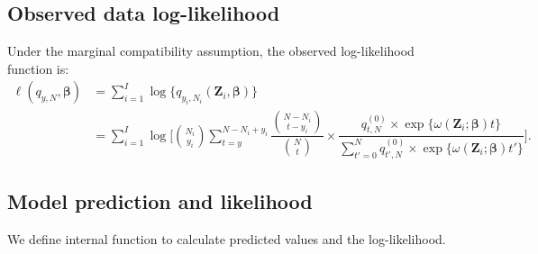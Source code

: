 \documentclass[reqno]{amsart}
\begin{document}
\subsection{Observed data log-likelihood}
Under the marginal compatibility assumption, the observed log-likelihood function is:
\begin{equation}\label{E:loglikelihood}
\begin{split}
    \ell (q_{y,N}, \boldsymbol{\beta}) &= \sum_{i=1}^I \log \{ q_{y_i,N_i} (\boldsymbol{Z}_i, \boldsymbol{\beta}) \} \\
    &= \sum_{i=1}^I \log \bigg[ \binom{N_i}{y_i} \sum_{t=y}^{N-N_i+y_i} \dfrac{\binom{N-N_i}{t-y_i}}{\binom{N}{t}} \times \dfrac{q_{t,N}^{(0)} \times \exp \{ \omega(\boldsymbol{Z}_i; \boldsymbol{\beta}) t \}} {\sum_{t'=0}^{N} q_{t',N}^{(0)} \times \exp \{ \omega(\boldsymbol{Z}_i; \boldsymbol{\beta}) t' \}}  \bigg].
\end{split}
\end{equation}

\subsection{Model prediction and likelihood}
We define internal function to calculate predicted values and the log-likelihood.
\end{document}
